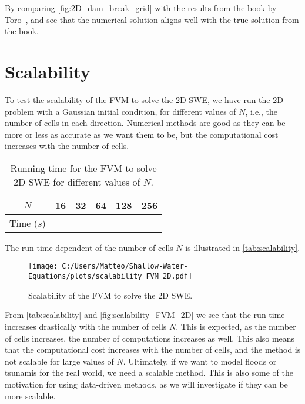 By comparing \autoref{fig:2D_dam_break_grid} with the results from the book by Toro~\cite{Toro2024}, and see that the numerical solution aligns well with the true solution from the book.

\section{Scalability}
To test the scalability of the FVM to solve the 2D SWE, we have run the 2D problem with a Gaussian initial condition, for different values of $N$, i.e., the number of cells in each direction.
Numerical methods are good as they can be more or less as accurate as we want them to be, but the computational cost increases with the number of cells.

\begin{table}[H]
    \centering
    \begin{tabular}{c|ccccc}
        \hline
        $N$ & 16 & 32 & 64 & 128 & 256 \\
        \hline 
        Time ($s$) & 
         &
         &
         &
         &
        
        \\
        \hline
    \end{tabular}
    \caption{Running time for the FVM to solve 2D SWE for different values of $N$.}\label{tab:scalability}
\end{table}

The run time dependent of the number of cells $N$ is illustrated in \autoref{tab:scalability}.
\begin{figure}[H]
    \centering
    \texttt{[image: C:/Users/Matteo/Shallow-Water-Equations/plots/scalability\_FVM\_2D.pdf]}
    \caption{Scalability of the FVM to solve the 2D SWE.}\label{fig:scalability_FVM_2D}
\end{figure}


From \autoref{tab:scalability} and \autoref{fig:scalability_FVM_2D} we see that the run time increases drastically with the number of cells $N$.
This is expected, as the number of cells increases, the number of computations increases as well.
This also means that the computational cost increases with the number of cells, and the method is not scalable for large values of $N$.
Ultimately, if we want to model floods or tsunamis for the real world, we need a scalable method.
This is also some of the motivation for using data-driven methods, as we will investigate if they can be more scalable.





